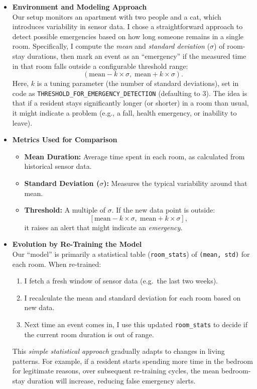 \documentclass[A4,10pt]{article}
\begin{document}
\begin{itemize}
    \item \textbf{Environment and Modeling Approach} \\
    Our setup monitors an apartment with two people and a cat, which introduces variability in sensor data. I chose a straightforward approach to detect possible emergencies based on how long someone remains in a single room. Specifically, I compute the \emph{mean} and \emph{standard deviation} (\( \sigma \)) of room-stay durations, then mark an event as an ``emergency'' if the measured time in that room falls outside a configurable threshold range:
    \[
      (\text{mean} - k \times \sigma, \;\text{mean} + k \times \sigma).
    \]
    Here, \(k\) is a tuning parameter (the number of standard deviations), set in code as \texttt{THRESHOLD\_FOR\_EMERGENCY\_DETECTION} (defaulting to 3). The idea is that if a resident stays significantly longer (or shorter) in a room than usual, it might indicate a problem (e.g., a fall, health emergency, or inability to leave).

    \item \textbf{Metrics Used for Comparison} \\
    \begin{itemize}
        \item \textbf{Mean Duration:} Average time spent in each room, as calculated from historical sensor data.
        \item \textbf{Standard Deviation (\(\sigma\)):} Measures the typical variability around that mean.
        \item \textbf{Threshold:} A multiple of \(\sigma\). If the new data point is outside:
        \[
          [\text{mean} - k \times \sigma,\; \text{mean} + k \times \sigma],
        \]
        it raises an alert that might indicate an \emph{emergency}.
    \end{itemize}

    \item \textbf{Evolution by Re-Training the Model} \\
    Our ``model'' is primarily a statistical table (\texttt{room\_stats}) of \texttt{(mean, std)} for each room. When re-trained:
    \begin{enumerate}
      \item I fetch a fresh window of sensor data (e.g.\ the last two weeks).
      \item I recalculate the mean and standard deviation for each room based on new data.
      \item Next time an event comes in, I use this updated \texttt{room\_stats} to decide if the current room duration is out of range.
    \end{enumerate}
    This \emph{simple statistical approach} gradually adapts to changes in living patterns. For example, if a resident starts spending more time in the bedroom for legitimate reasons, over subsequent re-training cycles, the mean bedroom-stay duration will increase, reducing false emergency alerts.


\end{itemize}
\end{document}
